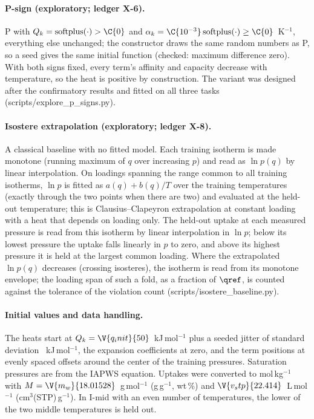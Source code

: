 \documentclass[11pt]{article}
\begin{document}
\paragraph{P-sign (exploratory; ledger X-6).} P with $Q_k = \mathrm{softplus}(\cdot) > \C{0}$ and $\alpha_k = \C{10^{-3}}\,\mathrm{softplus}(\cdot) \ge \C{0}$~K$^{-1}$, everything else unchanged; the constructor
draws the same random numbers as P, so a seed gives the same initial function (checked: maximum difference zero).
With both signs fixed, every term's affinity and capacity decrease with temperature, so the heat is positive by
construction. The variant was designed after the confirmatory results and fitted on all three tasks
(scripts/explore\_p\_signs.py).

\paragraph{Isostere extrapolation (exploratory; ledger X-8).} A classical baseline with no fitted model. Each training
isotherm is made monotone (running maximum of $q$ over increasing $p$) and read as $\ln p(q)$ by linear
interpolation. On  loadings spanning the range common to all training isotherms, $\ln p$ is fitted as
$a(q) + b(q)/T$ over the training temperatures (exactly through the two points when there are two) and evaluated at
the held-out temperature; this is Clausius--Clapeyron extrapolation at constant loading with a heat that depends on
loading only. The held-out uptake at each measured pressure is read from this isotherm by linear interpolation in
$\ln p$; below its lowest pressure the uptake falls linearly in $p$ to zero, and above its highest pressure it is held
at the largest common loading. Where the extrapolated $\ln p(q)$ decreases (crossing isosteres), the isotherm is read
from its monotone envelope; the loading span of such a fold, as a fraction of $\qref$, is counted against the
tolerance of the violation count (scripts/isostere\_baseline.py).

\paragraph{Initial values and data handling.} The heats start at $Q_k = \V{q_init}{50}$~kJ\,mol$^{-1}$ plus a
seeded jitter of standard deviation ~kJ\,mol$^{-1}$, the expansion coefficients at zero, and the term
positions at evenly spaced offsets around the center of the training pressures. Saturation pressures are from the
IAPWS equation\cite{wagner1993}. Uptakes were converted to mol\,kg$^{-1}$ with $M = \V{m_w}{18.01528}$~g\,mol$^{-1}$
(g\,g$^{-1}$, wt\,\%) and $\V{v_stp}{22.414}$~L\,mol$^{-1}$ (cm$^3$(STP)\,g$^{-1}$). In I-mid with an even number of
temperatures, the lower of the two middle temperatures is held out.
\end{document}
